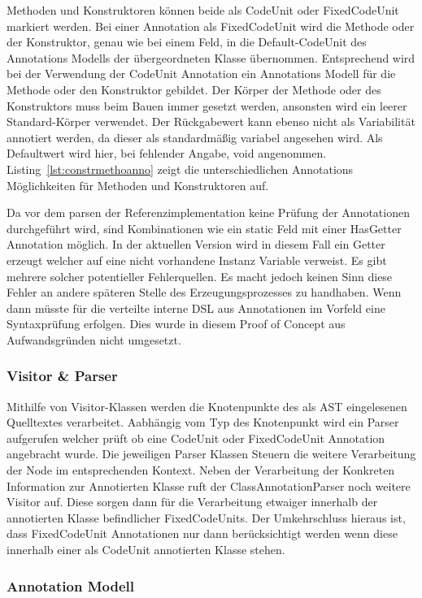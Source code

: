 \documentclass[12pt,oneside,a4paper,parskip]{scrbook}
\begin{document}
Methoden und Konstruktoren können beide als CodeUnit oder FixedCodeUnit markiert werden. Bei einer Annotation als FixedCodeUnit wird die Methode oder der Konstruktor, genau wie bei einem Feld, in die Default-CodeUnit des Annotations Modells der übergeordneten Klasse übernommen. Entsprechend wird bei der Verwendung der CodeUnit Annotation ein Annotations Modell für die Methode oder den Konstruktor gebildet. Der Körper der Methode oder des Konstruktors muss beim Bauen immer gesetzt werden, ansonsten wird ein leerer Standard-Körper verwendet. Der Rückgabewert kann ebenso nicht als Variabilität annotiert werden, da dieser als standardmäßig variabel angesehen wird. Als Defaultwert wird hier, bei fehlender Angabe, void angenommen. Listing~\ref{lst:constrmethoanno} zeigt die unterschiedlichen Annotations Möglichkeiten für Methoden und Konstruktoren auf.

Da vor dem parsen der Referenzimplementation keine Prüfung der Annotationen durchgeführt wird, sind Kombinationen wie ein static Feld mit einer HasGetter Annotation möglich. In der aktuellen Version wird in diesem Fall ein Getter erzeugt welcher auf eine nicht vorhandene Instanz Variable verweist. Es gibt mehrere solcher potentieller Fehlerquellen. Es macht jedoch keinen Sinn diese Fehler an andere späteren Stelle des Erzeugungsprozesses zu handhaben. Wenn dann müsste für die verteilte interne DSL aus Annotationen im Vorfeld eine Syntaxprüfung erfolgen. Dies wurde in diesem Proof of Concept aus Aufwandsgründen nicht umgesetzt.

\subsubsection{Visitor \& Parser}

Mithilfe von Visitor-Klassen werden die Knotenpunkte des als AST eingelesenen Quelltextes verarbeitet. Aabhängig vom Typ des Knotenpunkt wird ein Parser aufgerufen welcher prüft ob eine CodeUnit oder FixedCodeUnit Annotation angebracht wurde. Die jeweiligen Parser Klassen Steuern die weitere Verarbeitung der Node im entsprechenden Kontext. Neben der Verarbeitung der Konkreten Information zur Annotierten Klasse ruft der ClassAnnotationParser noch weitere Visitor auf. Diese sorgen dann für die Verarbeitung etwaiger innerhalb der annotierten Klasse befindlicher FixedCodeUnits. Der Umkehrschluss hieraus ist, dass FixedCodeUnit Annotationen nur dann berücksichtigt werden wenn diese innerhalb einer als CodeUnit annotierten Klasse stehen.

\subsubsection{Annotation Modell}
\end{document}

